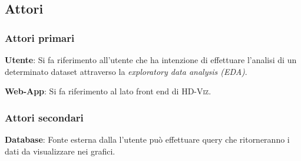 \documentclass[../analisi_dei_requisiti.tex]{subfiles}
\begin{document}
%
\subsection{Attori}%
\label{subs:attori}

\subsubsection{Attori primari}%
\label{sssec:attori_primari}
\begin{description}
 \item \textbf{Utente}: Si fa riferimento all'utente che ha intenzione di effettuare l'analisi di un determinato dataset attraverso la \emph{exploratory data analysis (EDA)}.
 \item \textbf{Web-App}: Si fa riferimento al lato front end di \textsc{HD-Viz}.
\end{description}

\subsubsection{Attori secondari}
\label{sssec:attori_secondari}
\begin{description}
    \item \textbf{Database}: Fonte esterna dalla l'utente può effettuare query che ritorneranno i dati da visualizzare nei grafici.
\end{description}


\newpage

\newpage

\newpage

\newpage

\newpage


\end{document}
